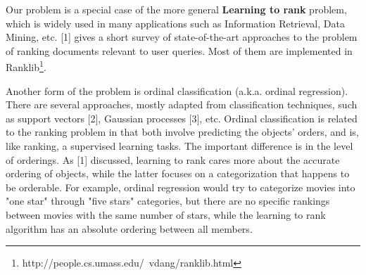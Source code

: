 Our problem is a special case of the more general \textbf{Learning to rank} problem, which is widely used in many applications such as Information Retrieval, Data Mining, etc. [1] gives a short survey of state-of-the-art approaches to the problem of ranking documents relevant to user queries. Most of them are implemented in Ranklib\footnote{http://people.cs.umass.edu/~vdang/ranklib.html}.

Another form of the problem is ordinal classification (a.k.a. ordinal regression). There are several approaches, mostly adapted from classification techniques, such as support vectors [2], Gaussian processes [3], etc. Ordinal classification is related to the ranking problem in that both involve predicting the objects' orders, and is, like ranking, a supervised learning tasks. The important difference is in the level of orderings. As [1] discussed, learning to rank cares more about the accurate ordering of objects, while the latter focuses on a categorization that happens to be orderable. 
For example, ordinal regression would try to categorize movies into "one star" through "five stars" categories, but there are no specific rankings between movies with the same number of stars, while the learning to rank algorithm has an absolute ordering between all members.
